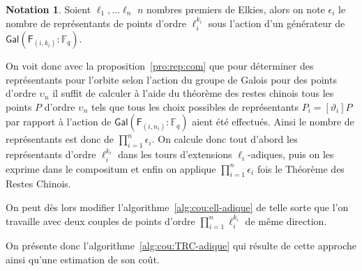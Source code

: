 \documentclass[10pt,a4paper]{book}
\theoremstyle{plain}
\theoremstyle{definition}
\theoremstyle{definition}
\theoremstyle{definition}
\theoremstyle{definition}
\theoremstyle{remark}
\theoremstyle{remark}
\theoremstyle{definition}
\newtheorem{nota}[thm]{Notation}
\begin{document}
\begin{nota}
Soient $\ell_1, \dots \ell_n$ $n$ nombres premiers de Elkies, alors on note 
$\epsilon_i$ le nombre de représentants de points d'ordre $\ell_i^{k_i}$ sous 
l'action d'un générateur de $\mathsf{Gal}(\mathsf{F}_{(i,k_i)}:\mathbb{F}_q)$.
\end{nota}

On voit donc avec la proposition~\ref{pro:rep:com} que pour déterminer des 
représentants pour l'orbite selon l'action du groupe de Galois pour des points 
d'ordre $\upsilon_n$ il suffit de calculer à l'aide du théorème des 
restes chinois tous les points $P$ d'ordre $\upsilon_n$ 
tels que tous les choix possibles de représentants $P_i=[\vartheta_i]P$
par rapport à l'action de $\mathsf{Gal}(\mathsf{F}_{(i,n_i)}:\mathbb{F}_q)$
 aient été effectués. Ainsi le nombre de représentants est
 donc de $\prod_{i=1}^{n} \epsilon_i$. On calcule donc 
 tout d'abord les représentants d'ordre $\ell_i^{k_i}$ dans les tours 
 d'extensions $\ell_i$-adiques, puis on les exprime dans le compositum et enfin
 on applique $\prod_{i=1}^{n} \epsilon_i$ fois le Théorème des Restes Chinois. 
  
 On peut dès lors modifier l'algorithme~\ref{alg:cou:ell-adique} de telle sorte
 que l'on travaille avec deux couples de points d'ordre 
 $\prod_{i=1}^n\ell_i^{k_i}$ de même direction.
 
 On présente donc l'algorithme~\ref{alg:cou:TRC-adique} qui résulte de cette approche ainsi qu'une 
 estimation de son coût.
 
\end{document}
